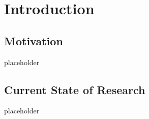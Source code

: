 \section{Introduction}
	\subsection{Motivation}
		{\color{red} \Large placeholder}
	\subsection{Current State of Research}
		{\color{red} \Large placeholder}
	